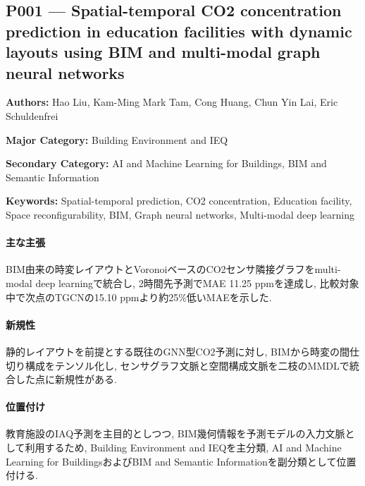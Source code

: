 \subsection{P001 --- Spatial-temporal CO2 concentration prediction in education facilities with dynamic layouts using BIM and multi-modal graph neural networks}
\label{paper:P001}
\textbf{Authors:} Hao Liu, Kam-Ming Mark Tam, Cong Huang, Chun Yin Lai, Eric Schuldenfrei\par
\textbf{Major Category:} Building Environment and IEQ\par
\textbf{Secondary Category:} AI and Machine Learning for Buildings, BIM and Semantic Information\par
\textbf{Keywords:} Spatial-temporal prediction, CO2 concentration, Education facility, Space reconfigurability, BIM, Graph neural networks, Multi-modal deep learning\par
\paragraph{主な主張}
BIM由来の時変レイアウトとVoronoiベースのCO2センサ隣接グラフをmulti-modal deep learningで統合し, 2時間先予測でMAE 11.25 ppmを達成し, 比較対象中で次点のTGCNの15.10 ppmより約25\%低いMAEを示した. \cite{Liu:2026DynamicCO2}
\paragraph{新規性}
静的レイアウトを前提とする既往のGNN型CO2予測に対し, BIMから時変の間仕切り構成をテンソル化し, センサグラフ文脈と空間構成文脈を二枝のMMDLで統合した点に新規性がある.
\paragraph{位置付け}
教育施設のIAQ予測を主目的としつつ, BIM幾何情報を予測モデルの入力文脈として利用するため, Building Environment and IEQを主分類, AI and Machine Learning for BuildingsおよびBIM and Semantic Informationを副分類として位置付ける.
